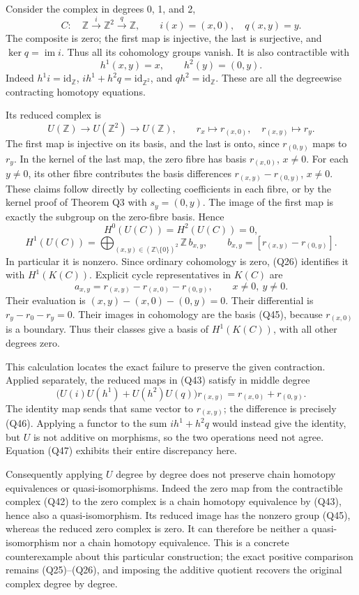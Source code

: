 \documentclass[
]{article}
\begin{document}
Consider the complex in degrees 0, 1, and 2, \[
C:\quad\mathbb Z\xrightarrow{\ i\ }\mathbb Z^2
\xrightarrow{\ q\ }\mathbb Z,
\qquad i(x)=(x,0),\quad q(x,y)=y.
\tag{Q42}
\] The composite is zero; the first map is injective, the last is
surjective, and \(\ker q=\operatorname{im}i\). Thus all its cohomology
groups vanish. It is also contractible with \[
h^1(x,y)=x,\qquad h^2(y)=(0,y).
\tag{Q43}
\] Indeed \(h^1i=\mathrm{id}_{\mathbb Z}\),
\(ih^1+h^2q=\mathrm{id}_{\mathbb Z^2}\), and
\(qh^2=\mathrm{id}_{\mathbb Z}\). These are all the degreewise
contracting homotopy equations.

Its reduced complex is \[
U(\mathbb Z)\longrightarrow U(\mathbb Z^2)\longrightarrow U(\mathbb Z),
\qquad r_x\longmapsto r_{(x,0)},\quad
r_{(x,y)}\longmapsto r_y.
\tag{Q44}
\] The first map is injective on its basis, and the last is onto, since
\(r_{(0,y)}\) maps to \(r_y\). In the kernel of the last map, the zero
fibre has basis \(r_{(x,0)}\), \(x\ne0\). For each \(y\ne0\), its other
fibre contributes the basis differences \(r_{(x,y)}-r_{(0,y)}\),
\(x\ne0\). These claims follow directly by collecting coefficients in
each fibre, or by the kernel proof of Theorem Q3 with \(s_y=(0,y)\). The
image of the first map is exactly the subgroup on the zero-fibre basis.
Hence \[
H^0(U(C))=H^2(U(C))=0,
\] \[
H^1(U(C))=
\bigoplus_{(x,y)\in(\mathbb Z\setminus\{0\})^2}
\mathbb Z\,b_{x,y},
\qquad
b_{x,y}=[r_{(x,y)}-r_{(0,y)}].
\tag{Q45}
\] In particular it is nonzero. Since ordinary cohomology is zero, (Q26)
identifies it with \(H^1(K(C))\). Explicit cycle representatives in
\(K(C)\) are \[
a_{x,y}=r_{(x,y)}-r_{(x,0)}-r_{(0,y)},
\qquad x\ne0,\ y\ne0.
\tag{Q46}
\] Their evaluation is \((x,y)-(x,0)-(0,y)=0\). Their differential is
\(r_y-r_0-r_y=0\). Their images in cohomology are the basis (Q45),
because \(r_{(x,0)}\) is a boundary. Thus their classes give a basis of
\(H^1(K(C))\), with all other degrees zero.

This calculation locates the exact failure to preserve the given
contraction. Applied separately, the reduced maps in (Q43) satisfy in
middle degree \[
\bigl(U(i)U(h^1)+U(h^2)U(q)\bigr)r_{(x,y)}
=r_{(x,0)}+r_{(0,y)}.
\tag{Q47}
\] The identity map sends that same vector to \(r_{(x,y)}\); the
difference is precisely (Q46). Applying a functor to the sum
\(ih^1+h^2q\) would instead give the identity, but \(U\) is not additive
on morphisms, so the two operations need not agree. Equation (Q47)
exhibits their entire discrepancy here.

Consequently applying \(U\) degree by degree does not preserve chain
homotopy equivalences or quasi-isomorphisms. Indeed the zero map from
the contractible complex (Q42) to the zero complex is a chain homotopy
equivalence by (Q43), hence also a quasi-isomorphism. Its reduced image
has the nonzero group (Q45), whereas the reduced zero complex is zero.
It can therefore be neither a quasi-isomorphism nor a chain homotopy
equivalence. This is a concrete counterexample about this particular
construction; the exact positive comparison remains (Q25)--(Q26), and
imposing the additive quotient recovers the original complex degree by
degree.
\end{document}

